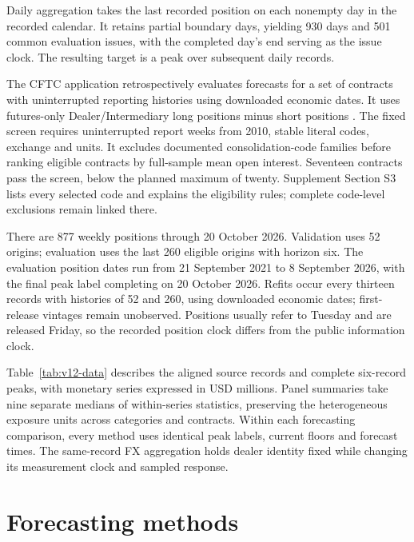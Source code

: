 \documentclass[12pt,a4paper]{article}
\begin{document}
Daily aggregation takes the last recorded position on each nonempty day in the recorded calendar. It retains partial boundary days, yielding 930 days and 501 common evaluation issues, with the completed day's end serving as the issue clock. The resulting target is a peak over subsequent daily records.

The CFTC application retrospectively evaluates forecasts for a set of contracts with uninterrupted reporting histories using downloaded economic dates. It uses futures-only Dealer/Intermediary long positions minus short positions \cite{cftcTFF}. The fixed screen requires uninterrupted report weeks from 2010, stable literal codes, exchange and units. It excludes documented consolidation-code families before ranking eligible contracts by full-sample mean open interest. Seventeen contracts pass the screen, below the planned maximum of twenty. Supplement Section S3 lists every selected code and explains the eligibility rules; complete code-level exclusions remain linked there.

There are 877 weekly positions through 20 October 2026. Validation uses 52 origins; evaluation uses the last 260 eligible origins with horizon six. The evaluation position dates run from 21 September 2021 to 8 September 2026, with the final peak label completing on 20 October 2026. Refits occur every thirteen records with histories of 52 and 260, using downloaded economic dates; first-release vintages remain unobserved. Positions usually refer to Tuesday and are released Friday, so the recorded position clock differs from the public information clock.

Table~\ref{tab:v12-data} describes the aligned source records and complete six-record peaks, with monetary series expressed in USD millions. Panel summaries take nine separate medians of within-series statistics, preserving the heterogeneous exposure units across categories and contracts. Within each forecasting comparison, every method uses identical peak labels, current floors and forecast times. The same-record FX aggregation holds dealer identity fixed while changing its measurement clock and sampled response.




\FloatBarrier

\section{Forecasting methods}\label{sec:methods}
\end{document}
